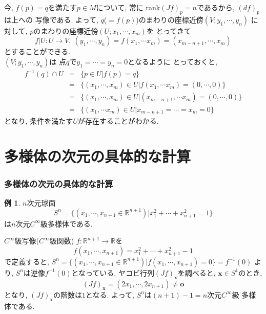 \documentclass[dvipdfmx,cjk]{beamer}
\theoremstyle{definition}
\newtheorem{ex}{\textbf{ 例 }}
\begin{document}
\begin{frame}
  \frametitle{}
    今, $f(p)=q$を満たす$p\in M$について, 常に
    rank$(Jf)_p=n$であるから, $(df)_p$は上への
    写像である. よって, 
    $q$($=f(p)$)のまわりの座標近傍$(V;y_1,\cdots ,y_n)$
    に対して, 
    $p$のまわりの座標近傍$(U;x_1,\cdots ,x_m)$を
    とってきて
    $$f|U:U\to V,\ (y_1,\cdots ,y_n)=f(x_1,\cdots x_m)
    =(x_{m-n+1},\cdots ,x_m)$$
    とすることができる.  \\
    $(V;y_1,\cdots ,y_n)$は
    点$q$で$y_1=\cdots =y_n=0$となるように
    とっておくと, 
    \begin{eqnarray*}
        f^{-1}(q)\cap U&=& \{p\in U|f(p)=q\}\\
        &=&\{(x_1,\cdots ,x_m)\in U|f(x_1,\cdots x_m)=(0,\cdots ,0)\}\\
        &=&\{(x_1,\cdots ,x_m)\in U|(x_{m-n+1},\cdots x_m)=(0,\cdots ,0)\}\\
        &=&\{(x_1,\cdots x_m)\in U|x_{m-n+1}=\cdots =x_m=0\}
    \end{eqnarray*}
    となり, 条件を満たす$U$が存在することがわかる. 
\end{frame}

\section{多様体の次元の具体的な計算}
\begin{frame}
  \frametitle{多様体の次元の具体的な計算}
  \begin{ex}
    $n$次元球面
    $$S^n=\{(x_1,\cdots ,x_{n+1}\in 
    \mathbb{R}^{n+1})|x_1^2+\cdots +x_{n+1}^2=1\}$$
    は$n$次元$C^\infty$級多様体である. 
\end{ex}
$C^\infty$級写像($C^\infty$級関数)
$f:\mathbb{R}^{n+1}\to \mathbb{R}$を
$$f(x_1,\cdots ,x_{n+1})=
x_1^2+\cdots +x_{n+1}^2-1$$
で定義すると, 
$S^n=\{(x_1,\cdots ,x_{n+1}\in 
\mathbb{R}^{n+1})|f(x_1,\cdots ,x_{n+1})=0\}
=f^{-1}(0)$
より, $S^n$は逆像$f^{-1}(0)$となっている. 
ヤコビ行列$(Jf)_{\boldsymbol{x}}$を調べると, 
$\boldsymbol{x}\in S^1$のとき, 
$$(Jf)_{\boldsymbol{x}}=(2x_1,\cdots ,2x_{n+1})
\neq \boldsymbol{o}$$
となり, $(Jf)_{\boldsymbol{x}}$の階数は$1$となる. 
よって, $S^n$は$(n+1)-1=n$次元$C^\infty$級
多様体である. 
\end{frame}
\end{document}
